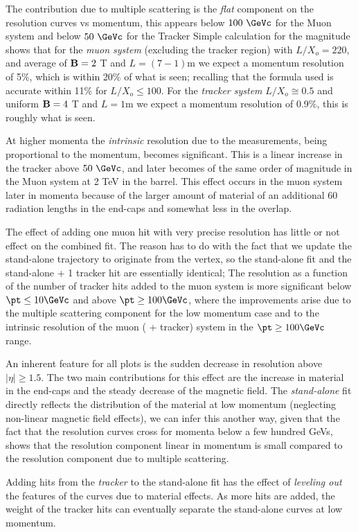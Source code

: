The contribution due to multiple scattering is the \emph{flat} component
on the resolution curves vs momentum, this appears below $100~\GeVc$ for
the Muon system and below $50~\GeVc$ for the Tracker Simple calculation
for the magnitude shows that for the \emph{muon system} (excluding the
tracker region) with $L/X_o=220$, and average of ${\bf{B}}=2$ T and
$L=(7-1)$m we expect a momentum resolution of 5\%, which is within 20\%
of what is seen; recalling that the formula used is accurate within 11\%
for $L/X_o\leq 100$. For the \emph{tracker system} $L/X_o \cong 0.5$ and
uniform ${\bf{B}}=4$ T and $L=1$m we expect a momentum resolution of
0.9\%, this is roughly what is seen.

At higher momenta the \emph{intrinsic} resolution due to the measurements, 
being proportional to the momentum, becomes significant. This is a 
linear increase in the tracker above $50~\GeVc$, and later becomes of the same order of magnitude in the Muon system at 2 TeV in the barrel. This effect occurs
in the muon system later in momenta because of the larger amount of
material of an additional 60 radiation lengths in the end-caps and
somewhat less in the overlap.

The effect of adding one muon hit with very precise resolution has
little or not effect on the combined fit. The reason has to do with the
fact that we update the stand-alone trajectory to originate from the
vertex, so the stand-alone fit and the stand-alone + 1 tracker hit are
essentially identical; The resolution as a function of the number of
tracker hits added to the muon system is more significant below $\pt
\leq 10 \GeVc$ and above $\pt \geq 100 \GeVc$, where the improvements
arise due to the multiple scattering component for the low momentum case
and to the intrinsic resolution of the muon ( + tracker) system in the
$\pt \geq 100 \GeVc$ range.

An inherent feature for all plots is the
sudden decrease in resolution above $|\eta|\geq 1.5$. The two main
contributions for this effect are the increase in material in the
end-caps and the steady decrease of the magnetic field. The
\emph{stand-alone} fit directly reflects the distribution of the
material at low momentum (neglecting non-linear magnetic field effects),
we can infer this another way, given that the fact that the resolution
curves cross for momenta below a few hundred GeVs, shows that the
resolution component linear in momentum is small compared to the
resolution component due to multiple scattering.

Adding hits from the \emph{tracker} to the stand-alone fit has the effect
of \emph{leveling out} the features of the curves due to material
effects.  As more hits are added, the weight of the tracker hits
can eventually separate the stand-alone curves at low momentum.

